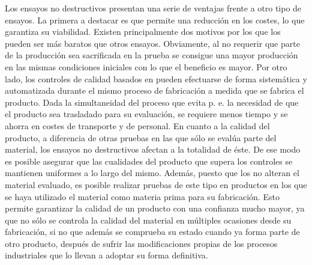 Los ensayos no destructivos presentan una serie de ventajas frente a otro
tipo de ensayos. La primera a destacar es que permite una reducción en los
costes, lo que garantiza su viabilidad. Existen principalmente dos motivos
por los que los  pueden ser más baratos que otros ensayos.
Obviamente, al no requerir que parte de la producción sea sacrificada en la
prueba se consigue una mayor producción en las mismas condiciones iniciales
con lo que el beneficio es mayor. Por otro lado, los controles de calidad
basados en  pueden efectuarse de forma sistemática y automatizada
durante el mismo proceso de fabricación a medida que se fabrica el
producto. Dada la simultaneidad del proceso que evita p. e. la necesidad de
que el producto sea trasladado para su evaluación, se requiere menos tiempo
y se ahorra en costes de transporte y de personal. En cuanto a la calidad
del producto, a diferencia de otras pruebas en las que sólo se evalúa parte
del material, los ensayos no destructivos afectan a la totalidad de éste.
De ese modo es posible asegurar que las cualidades del producto que supera
los controles se mantienen uniformes a lo largo del mismo. Además, puesto
que los  no alteran el material evaluado, es posible realizar
pruebas de este tipo en productos en los que se haya utilizado el material
como materia prima para su fabricación. Esto permite garantizar la calidad
de un producto con una confianza mucho mayor, ya que no sólo se controla la
calidad del material en múltiples ocasiones desde su fabricación, si no que
además se comprueba su estado cuando ya forma parte de otro producto,
después de sufrir las modificaciones propias de los procesos industriales
que lo llevan a adoptar su forma definitiva.

